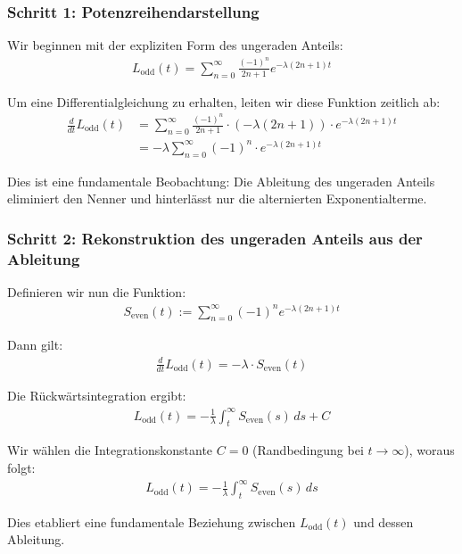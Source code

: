 \documentclass[a4paper, 12pt, twoside, openright]{report}
\theoremstyle{definition}
\theoremstyle{definition}
\begin{document}
\subsubsection*{Schritt 1: Potenzreihendarstellung}

Wir beginnen mit der expliziten Form des ungeraden Anteils:
\begin{align}
	L_{\text{odd}}(t) = \sum_{n=0}^{\infty} \frac{(-1)^n}{2n+1} e^{-\lambda(2n+1)t}
\end{align}

Um eine Differentialgleichung zu erhalten, leiten wir diese Funktion zeitlich ab:
\begin{align}
	\frac{d}{dt} L_{\text{odd}}(t) &= \sum_{n=0}^{\infty} \frac{(-1)^n}{2n+1} \cdot (-\lambda(2n+1)) \cdot e^{-\lambda(2n+1)t} \\
	&= -\lambda \sum_{n=0}^{\infty} (-1)^n \cdot e^{-\lambda(2n+1)t}
\end{align}

Dies ist eine fundamentale Beobachtung: Die Ableitung des ungeraden Anteils eliminiert den Nenner und hinterlässt nur die alternierten Exponentialterme.

\subsubsection*{Schritt 2: Rekonstruktion des ungeraden Anteils aus der Ableitung}

Definieren wir nun die Funktion:
\begin{align}
	S_{\text{even}}(t) := \sum_{n=0}^{\infty} (-1)^n e^{-\lambda(2n+1)t}
\end{align}

Dann gilt:
\begin{align}
	\frac{d}{dt} L_{\text{odd}}(t) = -\lambda \cdot S_{\text{even}}(t)
\end{align}

Die Rückwärtsintegration ergibt:
\begin{align}
	L_{\text{odd}}(t) = -\frac{1}{\lambda} \int_t^{\infty} S_{\text{even}}(s) \, ds + C
\end{align}

Wir wählen die Integrationskonstante $C = 0$ (Randbedingung bei $t \to \infty$), woraus folgt:
\begin{align}
	L_{\text{odd}}(t) = -\frac{1}{\lambda} \int_t^{\infty} S_{\text{even}}(s) \, ds
\end{align}

Dies etabliert eine fundamentale Beziehung zwischen $L_{\text{odd}}(t)$ und dessen Ableitung.
\end{document}
